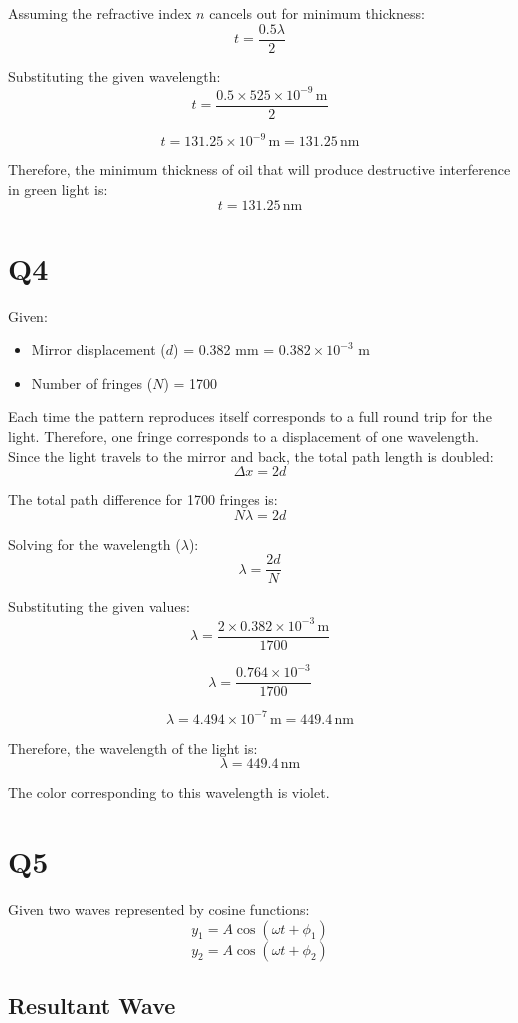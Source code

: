 \documentclass{article}
\begin{document}
Assuming the refractive index \(n\) cancels out for minimum thickness:
\[
t = \frac{0.5 \lambda}{2}
\]

Substituting the given wavelength:
\[
t = \frac{0.5 \times 525 \times 10^{-9} \, \text{m}}{2}
\]

\[
t = 131.25 \times 10^{-9} \, \text{m} = 131.25 \, \text{nm}
\]

Therefore, the minimum thickness of oil that will produce destructive interference in green light is:
\[
t = 131.25 \, \text{nm}
\]

\section*{Q4}

Given:
\begin{itemize}
    \item Mirror displacement ($d$) = 0.382 mm = \(0.382 \times 10^{-3}\) m
    \item Number of fringes ($N$) = 1700
\end{itemize}

Each time the pattern reproduces itself corresponds to a full round trip for the light. Therefore, one fringe corresponds to a displacement of one wavelength. Since the light travels to the mirror and back, the total path length is doubled:
\[
\Delta x = 2d
\]

The total path difference for 1700 fringes is:
\[
N \lambda = 2d
\]

Solving for the wavelength (\(\lambda\)):
\[
\lambda = \frac{2d}{N}
\]

Substituting the given values:
\[
\lambda = \frac{2 \times 0.382 \times 10^{-3} \, \text{m}}{1700}
\]

\[
\lambda = \frac{0.764 \times 10^{-3}}{1700}
\]

\[
\lambda = 4.494 \times 10^{-7} \, \text{m} = 449.4 \, \text{nm}
\]

Therefore, the wavelength of the light is:
\[
\lambda = 449.4 \, \text{nm}
\]

The color corresponding to this wavelength is violet.

\section*{Q5}

Given two waves represented by cosine functions:
\[
y_1 = A \cos(\omega t + \phi_1)
\]
\[
y_2 = A \cos(\omega t + \phi_2)
\]

\subsection*{Resultant Wave}
\end{document}
